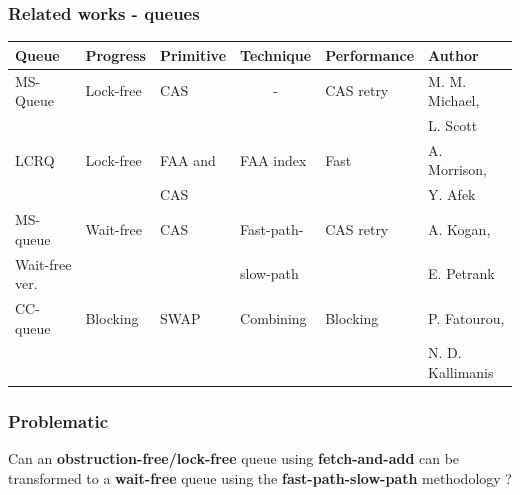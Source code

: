 \documentclass[10pt,a4paper]{beamer}
\begin{document}
\begin{frame}
  \frametitle{Related works - queues}
  \small
  \begin{tabular}{|l|l|l|l|l|l|}\hline
    Queue & Progress & Primitive & Technique & Performance & Author \\\hline
    MS-Queue & Lock-free & CAS & \multicolumn{1}{|c|}{-} & CAS retry & M. M. Michael, \\
    & & & & & L. Scott \\\hline
    LCRQ & Lock-free & FAA and & FAA index & Fast & A. Morrison, \\
    & & CAS & & & Y. Afek \\\hline
    MS-queue & Wait-free & CAS & Fast-path- & CAS retry & A. Kogan,\\
    Wait-free ver. & & & slow-path & & E. Petrank \\\hline
    CC-queue & Blocking & SWAP & Combining & Blocking & P. Fatourou, \\
    & & & & & N. D. Kallimanis \\\hline
  \end{tabular}
\end{frame}

\begin{frame}
  \frametitle{Problematic}
  \large Can an \textbf{obstruction-free/lock-free} queue using
  \textbf{fetch-and-add} can be transformed to a \textbf{wait-free} queue using
  the \textbf{fast-path-slow-path} methodology ?
\end{frame}
\end{document}
